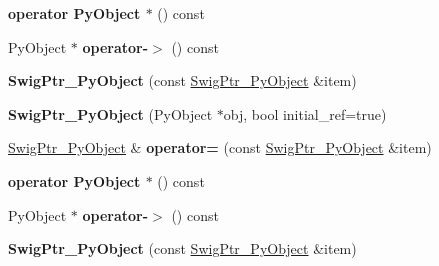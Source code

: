 \begin{DoxyCompactItemize}
\item 
\hypertarget{classswig_1_1SwigPtr__PyObject_aa2f1cdba0651c7a52482d225faef0574}{
{\bfseries operator PyObject $\ast$} () const }
\label{d2/d50/classswig_1_1SwigPtr__PyObject_aa2f1cdba0651c7a52482d225faef0574}

\item 
\hypertarget{classswig_1_1SwigPtr__PyObject_a97a20cad6a2b0916f39c45555fb559f0}{
PyObject $\ast$ {\bfseries operator-\/$>$} () const }
\label{d2/d50/classswig_1_1SwigPtr__PyObject_a97a20cad6a2b0916f39c45555fb559f0}

\item 
\hypertarget{classswig_1_1SwigPtr__PyObject_a4282f20207f8cd22c9b079203c832a04}{
{\bfseries SwigPtr\_\-PyObject} (const \hyperlink{classswig_1_1SwigPtr__PyObject}{SwigPtr\_\-PyObject} \&item)}
\label{d2/d50/classswig_1_1SwigPtr__PyObject_a4282f20207f8cd22c9b079203c832a04}

\item 
\hypertarget{classswig_1_1SwigPtr__PyObject_a4503d58d577d209f5e1fa67026852505}{
{\bfseries SwigPtr\_\-PyObject} (PyObject $\ast$obj, bool initial\_\-ref=true)}
\label{d2/d50/classswig_1_1SwigPtr__PyObject_a4503d58d577d209f5e1fa67026852505}

\item 
\hypertarget{classswig_1_1SwigPtr__PyObject_a86d8657d6b4a27c8e9e6942bc1ba572c}{
\hyperlink{classswig_1_1SwigPtr__PyObject}{SwigPtr\_\-PyObject} \& {\bfseries operator=} (const \hyperlink{classswig_1_1SwigPtr__PyObject}{SwigPtr\_\-PyObject} \&item)}
\label{d2/d50/classswig_1_1SwigPtr__PyObject_a86d8657d6b4a27c8e9e6942bc1ba572c}

\item 
\hypertarget{classswig_1_1SwigPtr__PyObject_aa2f1cdba0651c7a52482d225faef0574}{
{\bfseries operator PyObject $\ast$} () const }
\label{d2/d50/classswig_1_1SwigPtr__PyObject_aa2f1cdba0651c7a52482d225faef0574}

\item 
\hypertarget{classswig_1_1SwigPtr__PyObject_a97a20cad6a2b0916f39c45555fb559f0}{
PyObject $\ast$ {\bfseries operator-\/$>$} () const }
\label{d2/d50/classswig_1_1SwigPtr__PyObject_a97a20cad6a2b0916f39c45555fb559f0}

\item 
\hypertarget{classswig_1_1SwigPtr__PyObject_a4282f20207f8cd22c9b079203c832a04}{
{\bfseries SwigPtr\_\-PyObject} (const \hyperlink{classswig_1_1SwigPtr__PyObject}{SwigPtr\_\-PyObject} \&item)}
\label{d2/d50/classswig_1_1SwigPtr__PyObject_a4282f20207f8cd22c9b079203c832a04}


\end{DoxyCompactItemize}
